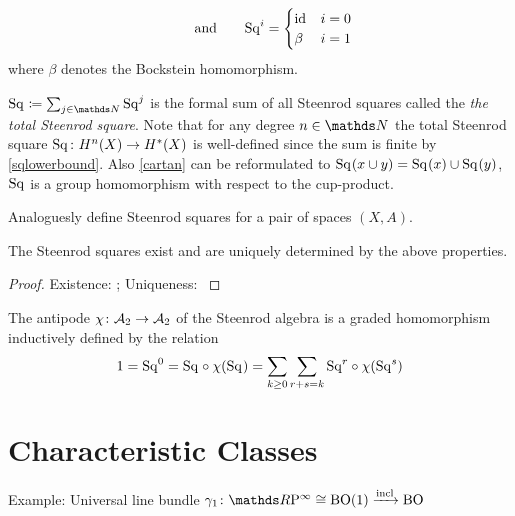 \begin{Def}
\begin{description}
\begin{gather}
      \qquad\text{and}\qquad
      \mathrm{Sq}^{i} = \begin{cases}
        \mathrm{id}_{} & i=0\\
        \beta & i=1
      \end{cases}
    \end{gather}
    where $\beta$ denotes the Bockstein homomorphism. %
  \end{description}
  $\Sq{}\coloneqq \sum_{j\in\Nat}\Sq j$ is the formal sum of all
  Steenrod squares called the \emph{the total Steenrod square}.
  Note that for any degree $n\in\Nat$ the total Steenrod square
  $\mathrm{Sq}^{}\colon H^n(X)\to H^*(X)$ is well-defined since the sum is
  finite by \eqref{sqlowerbound}.
  Also \ref{cartan} can be reformulated to
  $\mathrm{Sq}^{}(x\cup y) = \mathrm{Sq}^{}(x)\cup\mathrm{Sq}^{}(y)$, \idest $\mathrm{Sq}^{}$ is a group
  homomorphism with respect to the cup-product.

  Analoguesly define Steenrod squares for a pair of spaces $(X,A)$.
\end{Def}

\begin{Thm}
  The Steenrod squares exist and are uniquely determined by the above
  properties.
  \begin{proof} %
    Existence: \cite[Chapter 2]{mosher};
    Uniqueness: \cite[VIII §3]{steenrodepstein}
  \end{proof}
\end{Thm}

\begin{Def}%
\end{Def}

\begin{Def}\label{def:antipode}
  The antipode $\chi\colon \mathcal{A}_2\to\mathcal{A}_2$ of the Steenrod algebra is a
  graded homomorphism inductively defined by the relation
  \begin{gather*}
    1 = \mathrm{Sq}^{0}
    = \mathrm{Sq}^{} \circ \chi(\mathrm{Sq}^{})
    = \sum_{k\geq0}\sum_{r+s=k} \mathrm{Sq}^{r} \circ \chi(\mathrm{Sq}^{s})
  \end{gather*}
\end{Def}

\section{Characteristic Classes}
\begin{Def} %
  Example: Universal line bundle $\gamma_1\colon \RP\cong\BO(1)\xrightarrow{\incl} \BO$
\end{Def}

